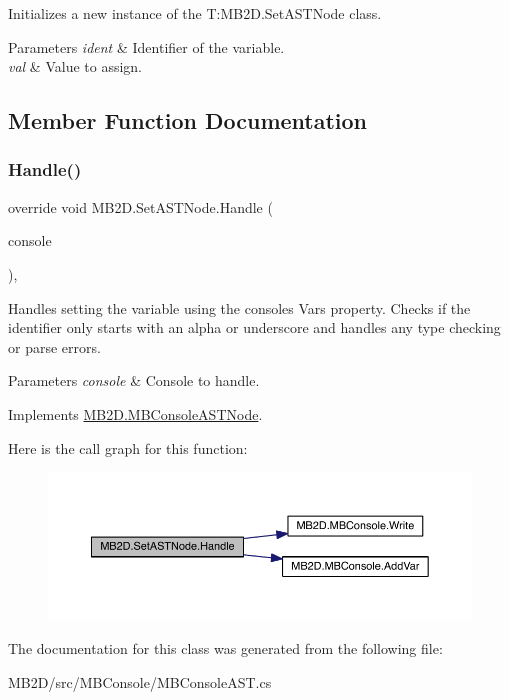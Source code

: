 Initializes a new instance of the T\+:\+M\+B2\+D.\+Set\+A\+S\+T\+Node class. 


\begin{DoxyParams}{Parameters}
{\em ident} & Identifier of the variable.\\
\hline
{\em val} & Value to assign.\\
\hline
\end{DoxyParams}


\subsection{Member Function Documentation}
\hypertarget{class_m_b2_d_1_1_set_a_s_t_node_a54eba248a545f6182c6a5509c4c1a6f2}{}\label{class_m_b2_d_1_1_set_a_s_t_node_a54eba248a545f6182c6a5509c4c1a6f2} 
\subsubsection{\texorpdfstring{Handle()}{Handle()}}
{\footnotesize\ttfamily override void M\+B2\+D.\+Set\+A\+S\+T\+Node.\+Handle (\begin{DoxyParamCaption}\item[{\hyperlink{class_m_b2_d_1_1_m_b_console}{M\+B\+Console}}]{console }\end{DoxyParamCaption})\hspace{0.3cm}{\ttfamily [inline]}, {\ttfamily [virtual]}}



Handles setting the variable using the consoles Vars property. Checks if the identifier only starts with an alpha or underscore and handles any type checking or parse errors. 


\begin{DoxyParams}{Parameters}
{\em console} & Console to handle.\\
\hline
\end{DoxyParams}


Implements \hyperlink{class_m_b2_d_1_1_m_b_console_a_s_t_node_aa70a49e61ab623698af4ed8fda4ebbf5}{M\+B2\+D.\+M\+B\+Console\+A\+S\+T\+Node}.

Here is the call graph for this function\+:
\nopagebreak
\begin{figure}[H]
\begin{center}
\leavevmode
\includegraphics[width=350pt]{class_m_b2_d_1_1_set_a_s_t_node_a54eba248a545f6182c6a5509c4c1a6f2_cgraph}
\end{center}
\end{figure}


The documentation for this class was generated from the following file\+:\begin{DoxyCompactItemize}
\item 
M\+B2\+D/src/\+M\+B\+Console/M\+B\+Console\+A\+S\+T.\+cs\end{DoxyCompactItemize}
